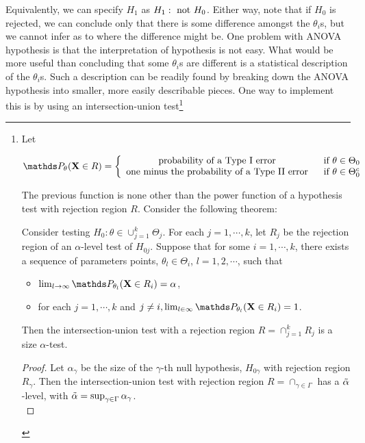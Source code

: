 \documentclass{homework}
\begin{document}
Equivalently, we can specify $H_1$ as $H_1: \textnormal{ not } H_0$. Either way, note that if $H_0$ is rejected, we can conclude only that there is some difference amongst the $\theta_i$s, but we cannot infer as to where the difference might be. One problem with ANOVA hypothesis is that the interpretation of hypothesis is not easy. What would be more useful than concluding that some $\theta_i$s are different is a statistical description of the  $\theta_i$s. Such a description can be readily found by breaking down the ANOVA hypothesis into smaller, more easily describable pieces. One way to implement this is by using an intersection-union test\footnote{Let

$$
\prob_{\theta}({\bf X} \in R) = \left\{ \begin{array}{cc}
    \textnormal{probability of a Type I error } & \textnormal{ if } \theta \in \Theta_0 \\
    \textnormal{one minus the probability of a Type II error } & \textnormal{ if } \theta \in \Theta_0^c  
\end{array} \right.
$$

The previous function is none other than the power function of a hypothesis test with rejection region $R$. Consider the following theorem: 

\begin{theo}
Consider testing $H_0: \theta \in \cup_{j=1}^k \Theta_j$. For each $j = 1, \cdots, k$, let $R_j$ be the rejection region of an $\alpha$-level test of $H_{0j}$. Suppose that for some $i = 1, \cdots, k$, there exists a sequence of parameters points, $\theta_l \in \Theta_i$, $l = 1,2, \cdots$, such that 

\begin{itemize}
    \item $\lim_{l \rightarrow \infty} \prob_{\theta_l}(\X \in R_i) = \alpha$,
    \item for each $j=1, \cdots, k$ and $j \neq i, \lim_{l \in \infty} \prob_{\theta_l}(\X \in R_i) = 1$.
\end{itemize}

Then the intersection-union test with a rejection region $R = \cap_{j=1}^k R_j$ is a size $\alpha$-test. 
\end{theo}

\begin{proof}
Let $\alpha_{\gamma}$ be the size of the $\gamma$-th null hypothesis, $H_{0\gamma}$ with rejection region $R_\gamma$. Then the intersection-union test with rejection region $R = \cap_{\gamma \in \Gamma}$ has a $\Tilde{\alpha}$-level, with $\Tilde{\alpha} = \sup_{\gamma \in \Gamma} \alpha_\gamma$. \\


\end{proof}}
\end{document}
